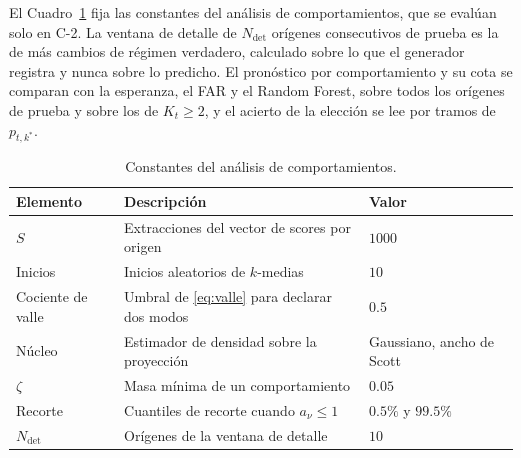 El Cuadro~\ref{tab:dis_comportamientos} fija las constantes del análisis de comportamientos, que se evalúan solo en C-2. La ventana de detalle de $N_{\mathrm{det}}$ orígenes consecutivos de prueba es la de más cambios de régimen verdadero, calculado sobre lo que el generador registra y nunca sobre lo predicho. El pronóstico por comportamiento y su cota se comparan con la esperanza, el FAR y el Random Forest, sobre todos los orígenes de prueba y sobre los de $K_t \geq 2$, y el acierto de la elección se lee por tramos de $p_{t,k^{*}}$.

\begin{table}[H]
\centering\small
\caption{Constantes del análisis de comportamientos.}
\label{tab:dis_comportamientos}
\begin{tabular}{p{} p{} p{}}
\hline
Elemento & Descripción & Valor \\
\hline
$S$               & Extracciones del vector de scores por origen       & $1000$ \\
Inicios           & Inicios aleatorios de $k$-medias                   & $10$ \\
Cociente de valle & Umbral de \eqref{eq:valle} para declarar dos modos & $0.5$ \\
Núcleo            & Estimador de densidad sobre la proyección          & Gaussiano, ancho de Scott \\
$\zeta$           & Masa mínima de un comportamiento                   & $0.05$ \\
Recorte           & Cuantiles de recorte cuando $a_\nu \leq 1$         & $0.5\%$ y $99.5\%$ \\
$N_{\mathrm{det}}$ & Orígenes de la ventana de detalle                 & $10$ \\
\hline
\end{tabular}
\end{table}
